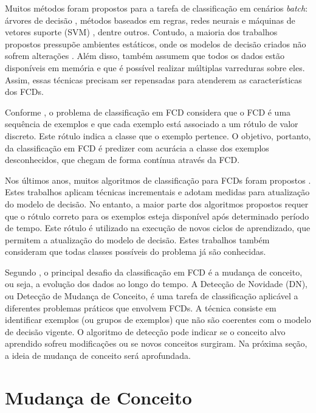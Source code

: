 \documentclass[qual, classic, a4paper]{ufbathesis}
\begin{document}
Muitos métodos foram propostos para a tarefa de classificação em cenários \textit{batch}:
árvores de decisão \cite{Breiman:Classification_Regression_Trees},
métodos baseados em regras, 
redes neurais e máquinas de vetores suporte (SVM) \cite{Vapnik1998}, 
dentre outros.
Contudo, a maioria dos trabalhos propostos pressupõe ambientes estáticos, onde os modelos de decisão criados não sofrem alterações \cite{Aggarwal:2006:DSM:1196418}.
Além disso, também assumem que todos os dados estão disponíveis em memória e que é possível realizar múltiplas varreduras sobre eles.
Assim, essas técnicas precisam ser repensadas para atenderem as características dos FCDs.

Conforme \cite{Chen:Tu}, o problema de classificação em FCD considera que o FCD é uma sequência de exemplos e que cada exemplo está associado a um rótulo de valor discreto.
Este rótulo indica a classe que o exemplo pertence.
O objetivo, portanto, da classificação em FCD é predizer com acurácia a classe dos exemplos desconhecidos, que chegam de forma contínua através da FCD.

Nos últimos anos, muitos algoritmos de classificação para FCDs foram propostos 
\cite{Domingos:2000:MHD:347090.347107, Bifet:2013:EDS:2480362.2480516, Wang:2003:MCD:956750.956778, Aggarwal:2004:DCD:1014052.1014110, Gama:2003:ADT:956750.956813}.
Estes trabalhos aplicam técnicas incrementais e adotam medidas para atualização do modelo de decisão.
No entanto, a maior parte dos algoritmos propostos requer que o rótulo correto para os exemplos esteja disponível após determinado período de tempo.
Este rótulo é utilizado na execução de novos ciclos de aprendizado, que permitem a atualização do modelo de decisão.
Estes trabalhos também consideram que todas classes possíveis do problema já são conhecidas. 

Segundo \cite{Aggarwal:2006:DSM:1196418}, o principal desafio da classificação em FCD é a mudança de conceito,
ou seja, a evolução dos dados ao longo do tempo.
A Detecção de Novidade (DN), ou Detecção de Mudança de Conceito, é uma tarefa de classificação aplicável a diferentes problemas práticos que envolvem FCDs.
A técnica consiste em identificar exemplos (ou grupos de exemplos) que não são coerentes com o modelo de decisão vigente.
O algoritmo de detecção pode indicar se o conceito alvo aprendido sofreu modificações ou se novos conceitos surgiram.
Na próxima seção, a ideia de mudança de conceito será aprofundada.

\section{Mudança de Conceito}
\blindtext
\end{document}
